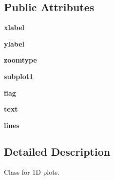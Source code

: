 \subsection*{Public Attributes}
\begin{DoxyCompactItemize}
\item 
\hypertarget{class_uni_dec_1_1unidec__modules_1_1plot1d_1_1_plot1d_ab6ee7aa1f3681f697cbe89a77f69418b}{}{\bfseries xlabel}\label{class_uni_dec_1_1unidec__modules_1_1plot1d_1_1_plot1d_ab6ee7aa1f3681f697cbe89a77f69418b}

\item 
\hypertarget{class_uni_dec_1_1unidec__modules_1_1plot1d_1_1_plot1d_afe92dd02632dfc752ac2e3792ea9b865}{}{\bfseries ylabel}\label{class_uni_dec_1_1unidec__modules_1_1plot1d_1_1_plot1d_afe92dd02632dfc752ac2e3792ea9b865}

\item 
\hypertarget{class_uni_dec_1_1unidec__modules_1_1plot1d_1_1_plot1d_aa4c2844a1d7accc0060951a392b46ab7}{}{\bfseries zoomtype}\label{class_uni_dec_1_1unidec__modules_1_1plot1d_1_1_plot1d_aa4c2844a1d7accc0060951a392b46ab7}

\item 
\hypertarget{class_uni_dec_1_1unidec__modules_1_1plot1d_1_1_plot1d_af07117886c234567f969ce25b5394a60}{}{\bfseries subplot1}\label{class_uni_dec_1_1unidec__modules_1_1plot1d_1_1_plot1d_af07117886c234567f969ce25b5394a60}

\item 
\hypertarget{class_uni_dec_1_1unidec__modules_1_1plot1d_1_1_plot1d_a5ef31a1d834371f3689dbbae4efcc338}{}{\bfseries flag}\label{class_uni_dec_1_1unidec__modules_1_1plot1d_1_1_plot1d_a5ef31a1d834371f3689dbbae4efcc338}

\item 
\hypertarget{class_uni_dec_1_1unidec__modules_1_1plot1d_1_1_plot1d_a9c86efb0314ccf9007e28bba28eb530b}{}{\bfseries text}\label{class_uni_dec_1_1unidec__modules_1_1plot1d_1_1_plot1d_a9c86efb0314ccf9007e28bba28eb530b}

\item 
\hypertarget{class_uni_dec_1_1unidec__modules_1_1plot1d_1_1_plot1d_a289c4433eeeb7d34a88e9a13e5d6eddd}{}{\bfseries lines}\label{class_uni_dec_1_1unidec__modules_1_1plot1d_1_1_plot1d_a289c4433eeeb7d34a88e9a13e5d6eddd}

\end{DoxyCompactItemize}


\subsection{Detailed Description}
\begin{DoxyVerb}Class for 1D plots.
\end{DoxyVerb}
 

